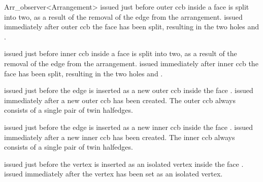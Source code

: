 \begin{ccRefClass}{Arr_observer<Arrangement>}
    {issued just before outer ccb  inside a face  is split into
     two, as a result of the removal of the edge  from the arrangement.}
\ccGlue
{}
    {issued immediately after outer ccb the face  has been split,
     resulting in the two holes  and .}

    {issued just before inner ccb  inside a face  is split into
     two, as a result of the removal of the edge  from the arrangement.}
\ccGlue
{}
    {issued immediately after inner ccb the face  has been split,
     resulting in the two holes  and .}

    {issued just before the edge  is inserted as a new outer ccb inside
     the face .}
\ccGlue
{}
    {issued immediately after a new outer ccb  has been created. The
     outer ccb always consists of a single pair of twin halfedges.}

    {issued just before the edge  is inserted as a new inner ccb inside
     the face .}
\ccGlue
{}
    {issued immediately after a new inner ccb  has been created. The
     inner ccb always consists of a single pair of twin halfedges.}

    {issued just before the vertex  is inserted as an isolated
     vertex inside the face .}
\ccGlue
{}
    {issued immediately after the vertex  has been set as an
     isolated vertex.}


\end{ccRefClass}
